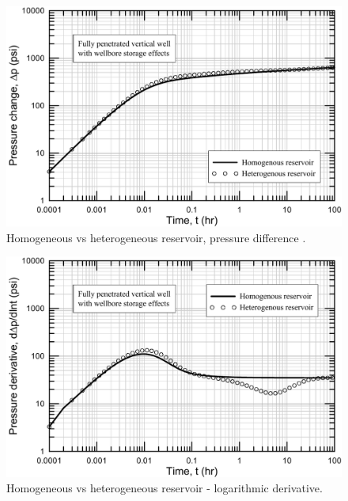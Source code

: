 \documentclass{llncs}
\numberwithin{equation}{section}
\numberwithin{figure}{section}
\numberwithin{table}{section}
\begin{document}
    \begin{figure}
        \begin{center}
        \includegraphics[scale=0.6]{Homogenous_vs_Heterogenous_dp.pdf}
        \caption{Homogeneous vs heterogeneous reservoir, pressure difference .}
        \label{Homogenous_vs_Heterogenous_dp}
        \end{center}
    \end{figure}

    \begin{figure}
        \begin{center}
        \includegraphics[scale=0.6]{Homogenous_vs_Heterogenous_dpder.pdf}
        \caption{Homogeneous vs heterogeneous reservoir - logarithmic derivative.}
        \label{Homogenous_vs_Heterogenous_dpder}
        \end{center}
    \end{figure}
\end{document}
